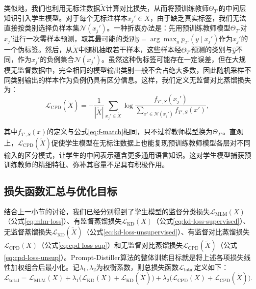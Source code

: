 \documentclass[../main.tex]{subfiles}
\begin{document}
类似地，我们也利用无标注数据$\tilde{X}$计算对比损失，从而将预训练教师$\Theta_{T'}$的中间层知识引入学生模型。对于每个无标注样本$x_j'\in \tilde{X}$，由于缺乏真实标签，我们无法直接按类别选择负样本集$\mathcal{N}(x_j')$。一种折衷办法是：先用预训练教师模型$\Theta_{T'}$对$x_j'$进行一次零样本预测，取其最可能的类别$\hat{y} = \arg\max_{y} p_{T'}(y\mid x_j')$作为$x_j'$的一个伪标签。然后，从$\tilde{X}$中随机抽取若干样本，这些样本经$\Theta_{T'}$预测的类别与$\hat{y}$不同，作为$x_j'$的负例集合$\mathcal{N}(x_j')$。虽然这种伪标签可能存在一定误差，但在大规模无监督数据中，完全相同的模型输出类别一般不会占绝大多数，因此随机采样不同类别输出的样本作为负例仍具有区分信息。这样，我们定义无监督对比蒸馏损失为：
\begin{equation}
	\label{eq:cpd-loss-unsup}
	\mathcal{L}_{\text{CPD}}(\tilde{X}) = -\frac{1}{|\tilde{X}|} \sum_{x_j' \in \tilde{X}} \log \frac{f_{T',S}(x_j')}{\displaystyle\sum_{x' \in \mathcal{N}(x_j')} f_{T',S}(x')} ,
\end{equation}

\noindent 其中$f_{T',S}(x)$的定义与公式\eqref{eq:f-match}相同，只不过将教师模型换为$\Theta_{T'}$。直观上，$\mathcal{L}_{\text{CPD}}(\tilde{X})$促使学生模型在无标注数据上也能复现预训练教师模型各层对不同输入的区分模式，让学生的中间表示蕴含更多通用语言知识。这对学生模型捕获预训练教师的精细特征、弥补其容量不足具有积极作用。

\subsection{损失函数汇总与优化目标}
结合上一小节的讨论，我们已经分别得到了学生模型的监督分类损失$\mathcal{L}_{\text{MLM}}(X)$（公式\eqref{eq:mlm-loss}）、有监督蒸馏损失$\mathcal{L}_{\text{KD}}(X)$（公式\eqref{eq:kd-loss-supervised}）、无监督蒸馏损失$\mathcal{L}_{\text{KD}}(\tilde{X})$（公式\eqref{eq:kd-loss-unsupervised}）、有监督对比蒸馏损失$\mathcal{L}_{\text{CPD}}(X)$（公式\eqref{eq:cpd-loss-sup}）和无监督对比蒸馏损失$\mathcal{L}_{\text{CPD}}(\tilde{X})$（公式\eqref{eq:cpd-loss-unsup}）。Prompt-Distiller算法的整体训练目标就是将上述各项损失线性加权组合后最小化。记$\lambda_1,\lambda_2$为权衡系数，则总损失函数$\mathcal{L}_{\text{total}}$定义如下：
\begin{equation}
	\label{eq:total-loss}
	\mathcal{L}_{\text{total}} = \mathcal{L}_{\text{MLM}}(X) + \lambda_1 \Big( \mathcal{L}_{\text{KD}}(X) + \mathcal{L}_{\text{KD}}(\tilde{X}) \Big) + \lambda_2 \Big( \mathcal{L}_{\text{CPD}}(X) + \mathcal{L}_{\text{CPD}}(\tilde{X}) \Big).
\end{equation}
\end{document}
